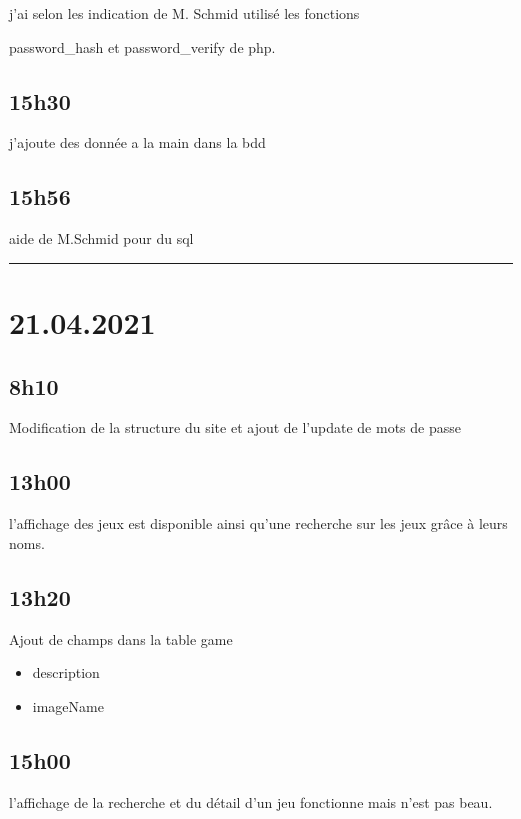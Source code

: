 \documentclass[a4paper,12pt,french]{sphinxmanual}
\begin{document}
\sphinxAtStartPar
j’ai selon les indication de M. Schmid utilisé les fonctions

\sphinxAtStartPar
password\_hash et password\_verify de php.


\subsection{15h30}
\label{\detokenize{logbook:id9}}
\sphinxAtStartPar
j’ajoute des donnée a la main dans la bdd


\subsection{15h56}
\label{\detokenize{logbook:h56}}
\sphinxAtStartPar
aide de M.Schmid pour du sql


\bigskip\hrule\bigskip



\section{21.04.2021}
\label{\detokenize{logbook:id10}}

\subsection{8h10}
\label{\detokenize{logbook:h10}}
\sphinxAtStartPar
Modification de la structure du site et ajout de l’update de mots de passe


\subsection{13h00}
\label{\detokenize{logbook:h00}}
\sphinxAtStartPar
l’affichage des jeux est disponible ainsi qu’une recherche sur les jeux grâce à leurs noms.


\subsection{13h20}
\label{\detokenize{logbook:id11}}
\sphinxAtStartPar
Ajout de champs dans la table game
\begin{itemize}
\item {} 
\sphinxAtStartPar
description

\item {} 
\sphinxAtStartPar
imageName

\end{itemize}


\subsection{15h00}
\label{\detokenize{logbook:id12}}
\sphinxAtStartPar
l’affichage de la recherche et du détail d’un jeu fonctionne mais n’est pas beau.
\end{document}
